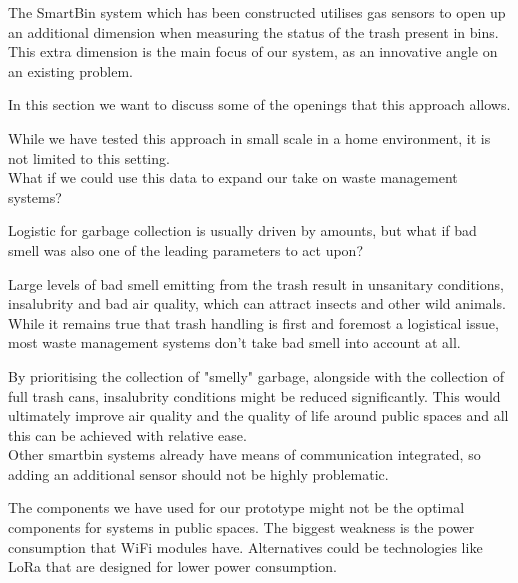 \iffalse
discussion

here emphasize  about the famous What IF question

take this INNOVATIVE aspect and use it in waste management

in the conclusion:
we can build it, it works, the technology is out there
in the discussion:
it can be applied somewhere else
it can extend other systems
used for innovation
it's a different take
\fi

The SmartBin system which has been constructed utilises gas sensors to open up an additional dimension when measuring the status of the trash present in bins.
This extra dimension is the main focus of our system, as an innovative angle on an existing problem.

In this section we want to discuss some of the openings that this approach allows.

While we have tested this approach in small scale in a home environment, it is not limited to this setting.\\
What if we could use this data to expand our take on waste management systems?

Logistic for garbage collection is usually driven by amounts, but what if bad smell was also one of the leading parameters to act upon?

Large levels of bad smell emitting from the trash result in unsanitary conditions, insalubrity and bad air quality, which can attract insects and other wild animals.
While it remains true that trash handling is first and foremost a logistical issue, most waste management systems don't take bad smell into account at all.

By prioritising the collection of "smelly" garbage, alongside with the collection of full trash cans, insalubrity conditions might be reduced significantly.
This would ultimately improve air quality and the quality of life around public spaces and all this can be achieved with relative ease.\\
Other smartbin systems already have means of communication integrated, so adding an additional sensor should not be highly problematic.

The components we have used for our prototype might not be the optimal components for systems in public spaces.
The biggest weakness is the power consumption that WiFi modules have. Alternatives could be technologies like LoRa that are designed for lower power consumption\cite{lora}.
 

